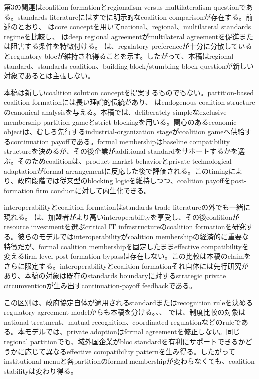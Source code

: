 第3の関連はcoalition formationとregionalism-versus-multilateralism questionである。standards literatureにはすでに明示的なcoalition comparisonが存在する。前述のとおり、\citet{takaradaEtAl2020} はcore conceptを用いてnational、regional、multilateral standards regimeを比較し、\citet{kawabataTakarada2021} はdeep regional agreementがmultilateral agreementを促進または阻害する条件を特徴付ける。\citet{parentiVannoorenberghe2025} は、regulatory preferenceが十分に分散しているとregulatory blocが維持され得ることを示す。したがって、本稿はregional standard、standards coalition、building-block/stumbling-block questionが新しい対象であるとは主張しない。

本稿は新しいcoalition solution conceptを提案するものでもない。partition-based coalition formationには長い理論的伝統があり、\citet{hartKurz1983} はendogenous coalition structureのcanonical analysisを与える。本稿では、deliberately simpleなexclusive-membership partition gameとstrict blockingを用いる。関心のあるeconomic objectは、むしろ先行するindustrial-organization stageがcoalition gameへ供給するcontinuation payoffである。formal membershipはbaseline compatibility structureを決めるが、その後企業がadditional standardをサポートするかを選ぶ。そのためcoalitionは、product-market behaviorとprivate technological adaptationがformal arrangementに反応した後で評価される。このtimingにより、政府段階では従来型のblocking logicを維持しつつ、coalition payoffをpost-formation firm conductに対して内生化できる。

interoperabilityとcoalition formationはstandards-trade literatureの外でも一緒に現れる。\citet{guoLiuNault2024} は、加盟者がより高いinteroperabilityを享受し、その後coalitionがresource investmentを選ぶcritical IT infrastructureのcoalition formationを研究する。彼らのモデルではinteroperabilityがcoalition membershipの経済的に重要な特徴だが、formal coalition membershipを固定したままeffective compatibilityを変えるfirm-level post-formation bypassは存在しない。この比較は本稿のclaimをさらに限定する。interoperabilityとcoalition formationそれ自体には先行研究があり、本稿の対象は既存のstandards boundaryに対するstrategic private circumventionが生み出すcontinuation-payoff feedbackである。

この区別は、政府協定自体が適用されるstandardまたはrecognition ruleを決めるregulatory-agreement modelからも本稿を分ける。\citet{costinot2008}、\citet{geng2019}、\citet{grossmanMcCalmanStaiger2021} では、制度比較の対象はnational treatment、mutual recognition、coordinated regulationなどのruleである。本モデルでは、private adoptionはformal agreementを修正しない。同じregional partitionでも、域外国企業がbloc standardを有利にサポートできるかどうかに応じて異なるeffective compatibility patternを生み得る。したがってinstitutional menuと各partitionのformal membershipが変わらなくても、coalition stabilityは変わり得る。

